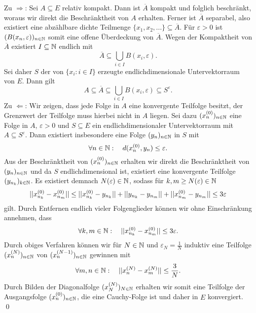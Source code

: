 \begin{proof*}
    Zu $\Rightarrow$: Sei $A \subseteq E$ relativ kompakt. Dann ist $\overline{A}$ kompakt und folglich beschränkt, woraus wir direkt die Beschränktheit von $A$ erhalten. 
    Ferner ist $\overline{A}$ separabel, also existiert eine abzählbare dichte Teilmenge $\{x_1, x_2,...\} \subseteq \overline{A}$. 
    Für $\varepsilon > 0$ ist $(B(x_n, \varepsilon))_{n \in \mathbb{N}}$ somit eine offene Überdeckung von $\overline{A}$. Wegen der Kompaktheit von $\overline{A}$ existiert $I \subseteq \mathbb{N}$ endlich mit 
    $$
        \overline{A} \subseteq \bigcup_{i \in I}B(x_i, \varepsilon).
    $$
    Sei daher $S$ der von $\{x_i : i \in I\}$ erzeugte endlichdimensionale Untervektorraum von $E$. Dann gilt 
    $$
        A \subseteq \overline{A} \subseteq \bigcup_{i \in I}B(x_i, \varepsilon) \subseteq S^{\varepsilon}.
    $$
    Zu $\Leftarrow$: Wir zeigen, dass jede Folge in $A$ eine konvergente Teilfolge besitzt, der Grenzwert der Teilfolge muss hierbei nicht in $A$ liegen. 
    Sei dazu $(x^{(0)}_n)_{n \in \mathbb{N}}$ eine Folge in $A$, $\varepsilon > 0$ und $S \subseteq E$ ein endlichdimensionaler Untervektorraum mit $A \subseteq S^{\varepsilon}$. 
    Dann existiert insbesondere eine Folge $(y_n)_{n \in \mathbb{N}}$ in $S$ mit 
    $$
        \forall n \in \mathbb{N}: \quad d(x^{(0)}_n, y_n) \leq \varepsilon.
    $$
    Aus der Beschränktheit von $(x^{(0)}_n)_{n \in \mathbb{N}}$ erhalten wir direkt die Beschränktheit von $(y_n)_{n \in \mathbb{N}}$ und da $S$ endlichdimensional ist, existiert eine konvergente Teilfolge $(y_{n_k})_{k \in \mathbb{N}}$.
    Es existiert demnach $N(\varepsilon) \in \mathbb{N}$, sodass für $k,m \geq N(\varepsilon) \in \mathbb{N}$
    \begin{align*}
        \lvert\lvert x^{(0)}_{n_k} - x^{(0)}_{n_m} \rvert\rvert \leq \lvert\lvert x^{(0)}_{n_k} - y_{n_k} \rvert\rvert + \lvert\lvert y_{n_k} - y_{n_m} \rvert\rvert + \lvert\lvert x^{(0)}_{n_m} - y_{n_m} \rvert\rvert \leq 3\varepsilon
    \end{align*}
    gilt. 
    Durch Entfernen endlich vieler Folgenglieder können wir ohne Einschränkung annehmen, dass 
    $$
        \forall k,m \in \mathbb{N}: \quad \lvert\lvert x^{(0)}_{n_k} - x^{(0)}_{n_m} \rvert\rvert \leq 3\varepsilon. 
    $$
    Durch obiges Verfahren können wir für $N \in \mathbb{N}$ und $\varepsilon_N = \frac{1}{N}$ induktiv eine Teilfolge $(x^{(N)}_n)_{n \in \mathbb{N}}$ von $(x^{(N-1)}_n)_{n \in \mathbb{N}}$ gewinnen mit
    $$
        \forall m,n \in \mathbb{N}: \quad \lvert\lvert x^{(N)}_n - x^{(N)}_m \rvert\rvert \leq \frac{3}{N}.
    $$
    Durch Bilden der Diagonalfolge $(x^{(N)}_N)_{N \in \mathbb{N}}$ erhalten wir somit eine Teilfolge der Ausgangsfolge $(x^{(0)}_n)_{n \in \mathbb{N}}$, die eine Cauchy-Folge ist und daher in $E$ konvergiert. 
    \qed 
\end{proof*}

